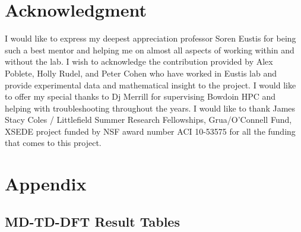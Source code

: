 \documentclass[
journal=jpcbfk, %
manuscript=article]{achemso}
\begin{document}
	\clearpage
	\appendix 
	\label{appendix}
	
	\clearpage
	
	\section*{Acknowledgment}
	I would like to express my deepest appreciation professor Soren Eustis for being such a best mentor and helping me on almost all aspects of working within and without the lab. I wish to acknowledge the contribution provided by Alex Poblete, Holly Rudel, and Peter Cohen who have worked in Eustis lab and provide experimental data and mathematical insight to the project. I would like to offer my special thanks to Dj Merrill for supervising Bowdoin HPC and helping with troubleshooting throughout the years. I would like to thank James Stacy Coles / Littlefield Summer Research Fellowships, Grua/O’Connell Fund, XSEDE project funded by NSF award number ACI 10-53575 for all the funding that comes to this project.
	
	
	
	\clearpage
	
	\section{Appendix}
	\subsection{MD-TD-DFT Result Tables}
	
\end{document}
